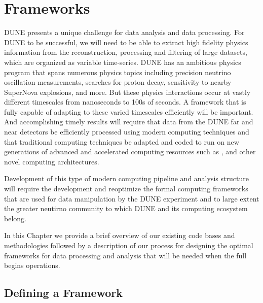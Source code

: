\documentclass[../main-v1.tex]{subfiles}
\begin{document}
\chapter{Frameworks }\label{ch:fworks}

DUNE presents a unique challenge for data analysis and data processing. For DUNE to be successful, we will need to be able to extract high fidelity physics information from the reconstruction, processing and filtering of large datasets, which are organized as variable time-series.   DUNE has an ambitious physics program that spans numerous physics topics including precision neutrino oscillation measurements, searches for proton decay, sensitivity to nearby SuperNova explosions, and more. But these physics interactions occur at vastly different timescales from nanoseconds to 100s of seconds. A framework that is fully capable of adapting to these varied timescales efficiently will be important. And accomplishing timely results will require that data from the DUNE far and near detectors  be efficiently processed using modern computing techniques and that traditional  computing techniques be adapted and coded to run on new generations of advanced and accelerated computing resources such as ,  and other novel computing architectures.  

Development of this type of modern computing pipeline and analysis structure will require the development and reoptimize the formal computing frameworks that are used for data manipulation by the DUNE experiment and to large extent the greater neutirno community to which DUNE and its computing ecosystem belong.

In this Chapter we provide a brief overview of our existing code bases and methodologies followed by a description of our process for designing the optimal frameworks for data processing and analysis that will be needed when the full  begins operations.  

\section{Defining a Framework}
\end{document}

